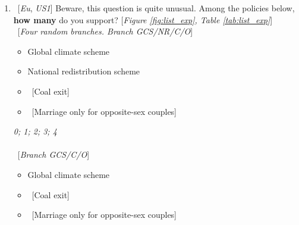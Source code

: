 \begin{enumerate}[resume]
\item ~[\textit{Eu}, \textit{US1}] \label{q:list_exp} Beware, this question is quite unusual. Among the policies below, \textbf{how many} do you support? [\textit{Figure \ref{fig:list_exp}, Table \ref{tab:list_exp}}]\\
~[\textit{Four random branches. Branch GCS/NR/C/O}] \\
\begin{itemize} \vspace{-1em}
    \item Global climate scheme 
    \item National redistribution scheme
    \item ~[Coal exit]  
    \item ~[Marriage only for opposite-sex couples]
\end{itemize}
\textit{0; 1; 2; 3; 4}\\
\\
~[\textit{Branch GCS/C/O}] \\
\begin{itemize}  \vspace{-1em}
    \item Global climate scheme 
    \item ~[Coal exit]  
    \item ~[Marriage only for opposite-sex couples]

\end{itemize}
\end{enumerate}
